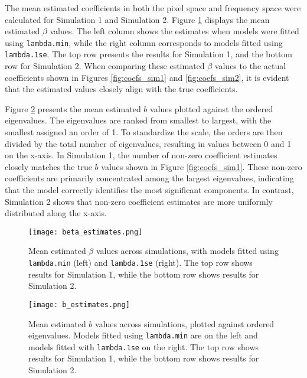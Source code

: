 \documentclass[12pt]{article}
\begin{document}
The mean estimated coefficients in both the pixel space and frequency space were calculated for Simulation 1 and
Simulation 2. Figure \ref{fig:beta_estimates} displays the mean estimated \( \beta \) values. The left column shows the
estimates when models were fitted using \texttt{lambda.min}, while the right column corresponds to models fitted using
\texttt{lambda.1se}. The top row presents the results for Simulation 1, and the bottom row for Simulation 2. When
comparing these estimated \( \beta \) values to the actual coefficients shown in Figures \ref{fig:coefs_sim1} and
\ref{fig:coefs_sim2}, it is evident that the estimated values closely align with the true coefficients.

Figure \ref{fig:b_estimates} presents the mean estimated \( b \) values plotted against the ordered eigenvalues. The
eigenvalues are ranked from smallest to largest, with the smallest assigned an order of 1. To standardize the scale, the
orders are then divided by the total number of eigenvalues, resulting in values between 0 and 1 on the x-axis. In
Simulation 1, the number of non-zero coefficient estimates closely matches the true \( b \) values shown in Figure
\ref{fig:coefs_sim1}. These non-zero coefficients are primarily concentrated among the largest eigenvalues, indicating
that the model correctly identifies the most significant components. In contrast, Simulation 2 shows that non-zero
coefficient estimates are more uniformly distributed along the x-axis.

\begin{figure}[htbp] 
	\centering
  \texttt{[image: beta\_estimates.png]} 
  \caption{Mean estimated \( \beta \) values across simulations, with models fitted using \texttt{lambda.min} (left) and
  \texttt{lambda.1se} (right). The top row shows results for Simulation 1, while the bottom row shows results for Simulation 2.}
	\label{fig:beta_estimates} 
\end{figure}

\begin{figure}[htbp] 
	\centering
  \texttt{[image: b\_estimates.png]} 
  \caption{Mean estimated \( b \) values across simulations, plotted against ordered eigenvalues. Models fitted using
  \texttt{lambda.min} are on the left and models fitted with \texttt{lambda.1se} on the right. The top row shows results for Simulation 1, while the bottom row shows results for Simulation 2.}
  \label{fig:b_estimates} 
\end{figure}
\end{document}
